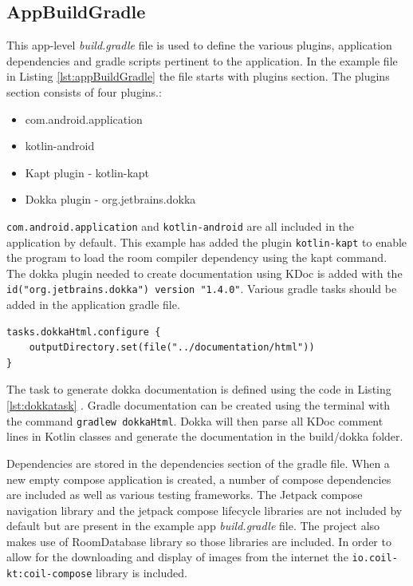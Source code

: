 \documentclass[12pt]{article}
\begin{document}
\subsection{AppBuildGradle}

This app-level  \textit{build.gradle} file is used to define the various plugins, application dependencies and gradle scripts pertinent to the application. In the example file in Listing \ref{lst:appBuildGradle} the file starts with plugins section. The plugins section consists of four plugins.:
\begin{itemize}
    \item com.android.application
    \item kotlin-android
    \item Kapt plugin - kotlin-kapt
    \item Dokka plugin - org.jetbrains.dokka
\end{itemize}
\verb|com.android.application| and \verb|kotlin-android| are all included in the application by default. This example has added the plugin \verb|kotlin-kapt| to enable the program to load the room compiler dependency using the kapt command. The dokka plugin needed to create documentation using KDoc is added with the \verb|id("org.jetbrains.dokka") version "1.4.0"|.
Various gradle tasks should be added in the application gradle file. 
\begin{lstlisting}[numbers=none, 
			caption=Task to generate Dokka documentation,
			label={lst:dokkatask}]
tasks.dokkaHtml.configure {
    outputDirectory.set(file("../documentation/html"))
}
\end{lstlisting}
The task to generate dokka documentation is defined using the code in Listing \ref{lst:dokkatask} . Gradle documentation can be created using the terminal with the command \verb|gradlew dokkaHtml|. Dokka will then parse all KDoc comment lines in Kotlin classes and generate the documentation in the build/dokka folder. 

Dependencies are stored in the dependencies section of the gradle file. When a new empty compose application is created, a number of compose dependencies are included as well as various testing frameworks. The Jetpack compose navigation library and the jetpack compose lifecycle libraries are not included by default but are present in the example app \textit{build.gradle} file. The project also makes use of RoomDatabase library so those libraries are included. In order to allow for the downloading and display of images from the internet the \verb|io.coil-kt:coil-compose| library is included. 
\end{document}
